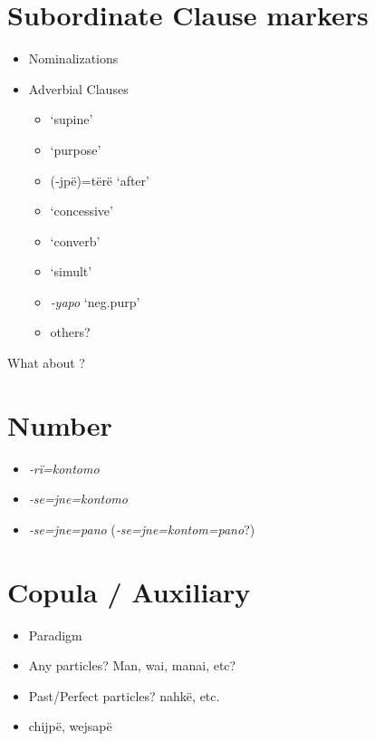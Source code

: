 \documentclass{memoir}
\begin{document}
\section{Subordinate Clause markers}

\begin{itemize}
\tightlist
\item
  Nominalizations
\item
  Adverbial Clauses

  \begin{itemize}
  \tightlist
  \item
     `supine'
  \item
     `purpose'
  \item
    (‑jpë)=tërë `after'
  \item
     `concessive'
  \item
     `converb'
  \item
     `simult'
  \item
    \emph{‑yapo} `neg.purp'
  \item
    others?
  \end{itemize}
\end{itemize}

What about ?

\section{Number}

\begin{itemize}
\tightlist
\item
  \emph{‑rï=kontomo}
\item
  \emph{‑se=jne=kontomo}
\item
  \emph{‑se=jne=pano} (\emph{‑se=jne=kontom=pano}?)
\end{itemize}

\section{Copula / Auxiliary}

\begin{itemize}
\tightlist
\item
  Paradigm
\item
  Any particles? Man, wai, manai, etc?
\item
  Past/Perfect particles? nahkë, etc.
\item
  chijpë, wejsapë
\end{itemize}
\end{document}
